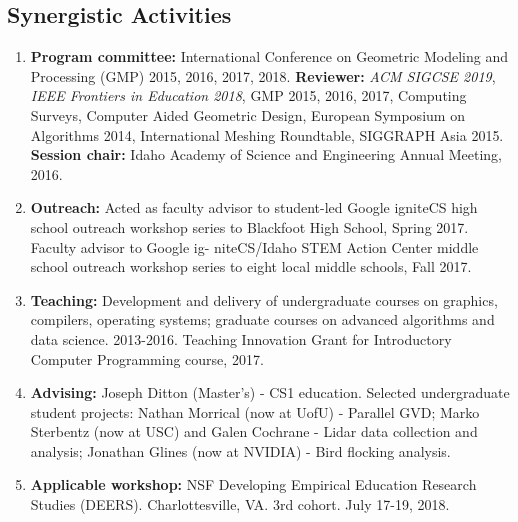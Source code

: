 \documentclass[svgnames,12pt]{article}
\newenvironment{tightenumerate}{
\begin{enumerate}
  \setlength{\itemsep}{1pt}
  \setlength{\parskip}{0pt}
  \setlength{\parsep}{0pt}
}{\end{enumerate}
}
\begin{document}
\subsection*{Synergistic Activities}
\begin{tightenumerate}
\item \textbf{Program committee:} International Conference on Geometric Modeling and Processing (GMP) 2015, 2016, 2017, 2018. \textbf{Reviewer:} \textit{ACM SIGCSE 2019}, \textit{IEEE Frontiers in Education 2018}, GMP 2015, 2016, 2017, Computing Surveys, Computer Aided Geometric Design, European Symposium on Algorithms 2014, International Meshing Roundtable, SIGGRAPH Asia 2015. \textbf{Session chair:} Idaho Academy of Science and Engineering Annual Meeting, 2016.
\item \textbf{Outreach:} Acted as faculty advisor to student-led Google igniteCS high school outreach workshop series to Blackfoot High School, Spring 2017. Faculty advisor to Google ig- niteCS/Idaho STEM Action Center middle school outreach workshop series to eight local middle schools, Fall 2017.
\item \textbf{Teaching:} Development and delivery of undergraduate courses on graphics, compilers, operating systems; graduate courses on advanced algorithms and data science. 2013-2016. Teaching Innovation Grant for Introductory Computer Programming course, 2017.
\item \textbf{Advising:} Joseph Ditton (Master's) - CS1 education. Selected undergraduate student projects: Nathan Morrical (now at UofU) - Parallel GVD; Marko Sterbentz (now at USC) and Galen Cochrane - Lidar data collection and analysis; Jonathan Glines (now at NVIDIA) - Bird flocking analysis.
\item \textbf{Applicable workshop:} NSF Developing Empirical Education Research Studies (DEERS). Charlottesville, VA. 3rd cohort. July 17-19, 2018.
\end{tightenumerate}
\end{document}
